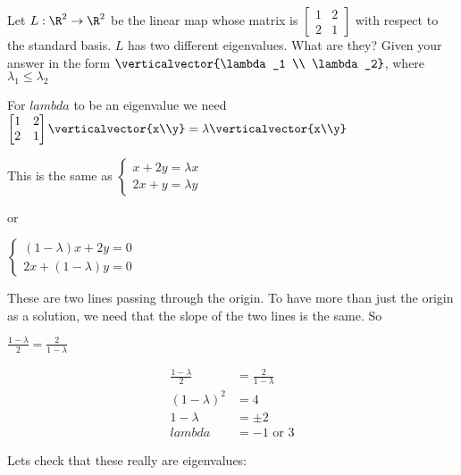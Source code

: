 \documentclass{ximera}
\begin{document}
\begin{question}
	Let $L :\R^2 \to \R^2$ be the linear map whose matrix  is \(\begin{bmatrix} 1 & 2 \\2& 1\end{bmatrix}\) with respect to the standard basis.  $L$ has two different
	eigenvalues.  What are they?  Given your answer in the form $\verticalvector{\lambda_1 \\ \lambda_2}$, where $\lambda_1 \leq \lambda_2$
	
	\begin{solution}
		\begin{hint}
			For $lambda$ to be an eigenvalue we need
			\(\begin{bmatrix} 1 & 2 \\2& 1\end{bmatrix} \verticalvector{x\\y} = \lambda \verticalvector{x\\y}\)
		\end{hint}
		\begin{hint}
			This is the same as \(\begin{cases}
			x+2y = \lambda x \\
			2x+y =\lambda y
			\end{cases}\)
			
			or
			
			 \(\begin{cases}
			(1-\lambda)x+2y = 0 \\
			2x+(1-\lambda)y =0
			\end{cases}\)
			
		\end{hint}
		\begin{hint}
			These are two lines passing through the origin.  To have more than just the origin as a solution, we need that the slope of the two lines is the same.  So
			
			\(
				\frac{1-\lambda}{2} = \frac{2}{1-\lambda}
			\)
		\end{hint}
		\begin{hint}
			\begin{align*}
				\frac{1-\lambda}{2} &= \frac{2}{1-\lambda}\\
				(1-\lambda)^2 &= 4\\
				1-\lambda &= \pm 2\\
				lambda &= -1 \text{ or } 3
			\end{align*}
		\end{hint}
		\begin{hint}
			Lets check that these really are eigenvalues:
			

\end{hint}
\end{solution}
\end{question}
\end{document}
